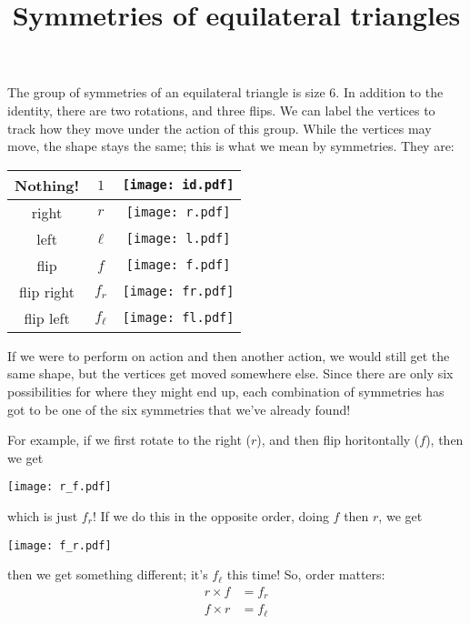 \documentclass[12pt]{report}
\title{Symmetries of equilateral triangles}
\begin{document}
\thispagestyle{empty}

The group of symmetries of an equilateral triangle is size 6.  In
addition to the identity, there are two rotations, and three flips.
We can label the vertices to track how they move under the action of
this group.  While the vertices may move, the shape stays the same; this
is what we mean by symmetries.  They are:
\begin{figure*}
   \centering
   \begin{tabular}{|c|c|c|}
     \hline
     Nothing! & $1$ & \texttt{[image: id.pdf]}\\
     \hline
     right & $r$ & \texttt{[image: r.pdf]}\\
     \hline
     left & $\ell$ &\texttt{[image: l.pdf]}\\
     \hline
     flip & $f$ & \texttt{[image: f.pdf]}\\
     \hline
     flip right & $f_r$ &\texttt{[image: fr.pdf]}\\
     \hline
     flip left & $f_\ell$ & \texttt{[image: fl.pdf]}\\
     \hline
   \end{tabular}
\end{figure*}

If we were to perform on action and then another action, we would
still get the same shape, but the vertices get moved somewhere else.
Since there are only six possibilities for where they might end up,
each combination of symmetries has got to be one of the six symmetries
that we've already found!

For example, if we first rotate to the right ($r$), and then flip
horitontally ($f$), then we get
\begin{figure*}[h]
  \centering
   \texttt{[image: r\_f.pdf]}
\end{figure*}
which is just $f_r$!  If we do this in the opposite order, doing $f$
then $r$, we get
\begin{figure*}[h]
  \centering
   \texttt{[image: f\_r.pdf]}
\end{figure*}
then we get something different; it's $f_\ell$ this time!  So, order matters:
\begin{eqnarray*}
  r \times{} f &= f_r\\
  f \times{} r &= f_\ell\\
\end{eqnarray*}
\end{document}
